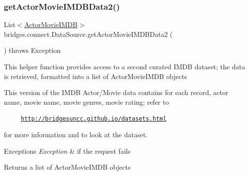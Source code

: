 \mbox{\label{classbridges_1_1connect_1_1_data_source_ae44e4ed7879e2755f8c66a335d8b6ad5}} 
\subsubsection{\texorpdfstring{get\+Actor\+Movie\+I\+M\+D\+B\+Data2()}{getActorMovieIMDBData2()}}
{\footnotesize\ttfamily List$<$\hyperlink{classbridges_1_1data__src__dependent_1_1_actor_movie_i_m_d_b}{Actor\+Movie\+I\+M\+DB}$>$ bridges.\+connect.\+Data\+Source.\+get\+Actor\+Movie\+I\+M\+D\+B\+Data2 (\begin{DoxyParamCaption}{ }\end{DoxyParamCaption}) throws Exception}

This helper function provides access to a second curated I\+M\+DB dataset; the data is retrieved, formatted into a list of Actor\+Movie\+I\+M\+DB objects

This version of the I\+M\+DB Actor/\+Movie data contains for each record, actor name, movie name, movie genres, movie rating; refer to 

~~~~~\href{http://bridgesuncc.github.io/datasets.html}{\tt http\+://bridgesuncc.\+github.\+io/datasets.\+html} 

for more information and to look at the dataset.


\begin{DoxyExceptions}{Exceptions}
{\em Exception} & if the request fails\\
\hline
\end{DoxyExceptions}
\begin{DoxyReturn}{Returns}
a list of Actor\+Movie\+I\+M\+DB objects 
\end{DoxyReturn}
\mbox{\label{classbridges_1_1connect_1_1_data_source_af2f6cd7172acb64b2ba49f134b5391f8}} 
